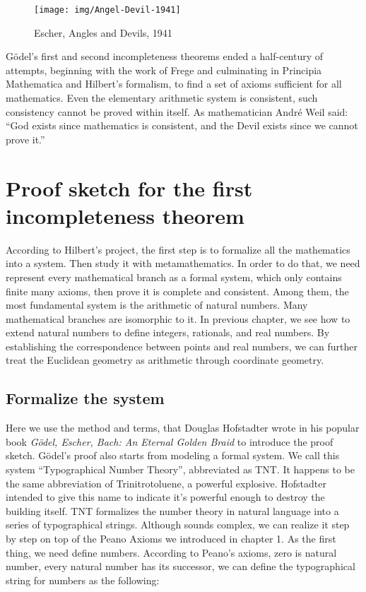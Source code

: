 \documentclass[b5paper]{article}
\begin{document}
\begin{figure}[htbp]
 \centering
 \texttt{[image: img/Angel-Devil-1941]}
 \caption{Escher, Angles and Devils, 1941}
 \label{fig:Angel-Devil-1941}
\end{figure}

Gödel's first and second incompleteness theorems ended a half-century of attempts, beginning with the work of Frege and culminating in Principia Mathematica and Hilbert's formalism, to find a set of axioms sufficient for all mathematics. Even the elementary arithmetic system is consistent, such consistency cannot be proved within itself. As mathematician André Weil said: ``God exists since mathematics is consistent, and the Devil exists since we cannot prove it.''\cite{HanXueTao16}

\section{Proof sketch for the first incompleteness theorem}

According to Hilbert's project, the first step is to formalize all the mathematics into a system. Then study it with metamathematics. In order to do that, we need represent every mathematical branch as a formal system, which only contains finite many axioms, then prove it is complete and consistent. Among them, the most fundamental system is the arithmetic of natural numbers. Many mathematical branches are isomorphic to it. In previous chapter, we see how to extend natural numbers to define integers, rationals, and real numbers. By establishing the correspondence between points and real numbers, we can further treat the Euclidean geometry as arithmetic through coordinate geometry.

\subsection{Formalize the system}
 
Here we use the method and terms, that Douglas Hofstadter wrote in his popular book {\em Gödel, Escher, Bach: An Eternal Golden Braid} to introduce the proof sketch. Gödel's proof also starts from modeling a formal system. We call this system ``Typographical Number Theory'', abbreviated as TNT. It happens to be the same abbreviation of Trinitrotoluene, a powerful explosive. Hofstadter intended to give this name to indicate it's powerful enough to destroy the building itself. TNT formalizes the number theory in natural language into a series of typographical strings. Although sounds complex, we can realize it step by step on top of the Peano Axioms we introduced in chapter 1. As the first thing, we need define numbers. According to Peano's axioms, zero is natural number, every natural number has its successor, we can define the typographical string for numbers as the following:
\end{document}
